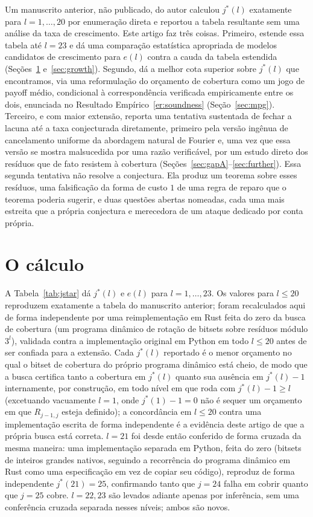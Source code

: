 \documentclass[11pt]{amsart}
\theoremstyle{plain}
\theoremstyle{definition}
\theoremstyle{remark}
\begin{document}
Um manuscrito anterior, não publicado, do autor calculou $j^*(l)$ exatamente para $l=1,\dots,20$
por enumeração direta e reportou a tabela resultante sem uma análise da taxa de crescimento. Este
artigo faz três coisas. Primeiro, estende essa tabela até $l=23$ e dá uma comparação estatística
apropriada de modelos candidatos de crescimento para $e(l)$ contra a cauda da tabela estendida
(Seções~\ref{sec:computation} e~\ref{sec:growth}). Segundo, dá a melhor cota superior sobre
$j^*(l)$ que encontramos, via uma reformulação do orçamento de cobertura como um jogo de payoff
médio, condicional à correspondência verificada empiricamente entre os dois, enunciada no Resultado
Empírico~\ref{er:soundness} (Seção~\ref{sec:mpg}). Terceiro, e com maior extensão, reporta uma
tentativa sustentada de fechar a lacuna até a taxa conjecturada diretamente, primeiro pela versão
ingênua de cancelamento uniforme da abordagem natural de Fourier e, uma vez que essa versão se
mostra malsucedida por uma razão verificável, por um estudo direto dos resíduos que de fato resistem
à cobertura (Seções~\ref{sec:gapA}--\ref{sec:further}). Essa segunda tentativa não resolve a
conjectura. Ela produz um teorema sobre esses resíduos, uma falsificação da forma de custo $1$ de
uma regra de reparo que o teorema poderia sugerir, e duas questões abertas nomeadas, cada uma mais
estreita que a própria conjectura e merecedora de um ataque dedicado por conta própria.

\section{O cálculo}
\label{sec:computation}

A Tabela~\ref{tab:jstar} dá $j^*(l)$ e $e(l)$ para $l=1,\dots,23$. Os valores para $l\le20$
reproduzem exatamente a tabela do manuscrito anterior; foram recalculados aqui de forma
independente por uma reimplementação em Rust feita do zero da busca de cobertura (um programa
dinâmico de rotação de bitsets sobre resíduos módulo $3^l$), validada contra a implementação
original em Python em todo $l\le20$ antes de ser confiada para a extensão. Cada $j^*(l)$ reportado
é o menor orçamento no qual o bitset de cobertura do próprio programa dinâmico está cheio, de modo
que a busca certifica tanto a cobertura em $j^*(l)$ quanto sua ausência em $j^*(l)-1$ internamente,
por construção, em todo nível em que roda com $j^*(l)-1\ge l$ (excetuando vacuamente $l=1$, onde
$j^*(1)-1=0$ não é sequer um orçamento em que $R_{j-1,j}$ esteja definido); a concordância em
$l\le20$ contra uma implementação escrita de forma independente é a evidência deste artigo de que a
própria busca está correta. $l=21$ foi desde então conferido de forma cruzada da mesma maneira: uma
implementação separada em Python, feita do zero (bitsets de inteiros grandes nativos, seguindo a
recorrência do programa dinâmico em Rust como uma especificação em vez de copiar seu código),
reproduz de forma independente $j^*(21)=25$, confirmando tanto que $j=24$ falha em cobrir quanto que
$j=25$ cobre. $l=22,23$ são levados adiante apenas por inferência, sem uma conferência cruzada
separada nesses níveis; ambos são novos.
\end{document}
